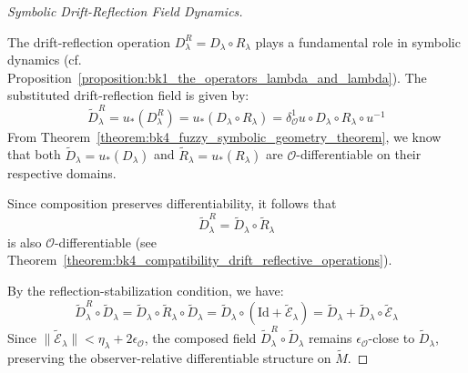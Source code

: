 \begin{proof}[Symbolic Drift-Reflection Field Dynamics]
\label{proof:bk4_drift_reflection_field}
\leavevmode

The drift-reflection operation \( D_\lambda^R = D_\lambda \circ R_\lambda \) plays a fundamental role in symbolic dynamics (cf. Proposition~\ref{proposition:bk1_the_operators_lambda_and_lambda}). The substituted drift-reflection field is given by:
\[
\tilde{D}_\lambda^R = u_*(D_\lambda^R) = u_*(D_\lambda \circ R_\lambda) = \delta^1_\mathcal{O}u \circ D_\lambda \circ R_\lambda \circ u^{-1}
\]
From Theorem~\ref{theorem:bk4_fuzzy_symbolic_geometry_theorem}, we know that both \( \tilde{D}_\lambda = u_*(D_\lambda) \) and \( \tilde{R}_\lambda = u_*(R_\lambda) \) are $\mathcal{O}$-differentiable on their respective domains.

Since composition preserves differentiability, it follows that
\[
\tilde{D}_\lambda^R = \tilde{D}_\lambda \circ \tilde{R}_\lambda
\]
is also $\mathcal{O}$-differentiable (see Theorem~\ref{theorem:bk4_compatibility_drift_reflective_operations}).

By the reflection-stabilization condition, we have:
\[
\tilde{D}_\lambda^R \circ \tilde{D}_\lambda = \tilde{D}_\lambda \circ \tilde{R}_\lambda \circ \tilde{D}_\lambda = \tilde{D}_\lambda \circ (\text{Id} + \tilde{\mathcal{E}}_\lambda) = \tilde{D}_\lambda + \tilde{D}_\lambda \circ \tilde{\mathcal{E}}_\lambda
\]
Since \( \|\tilde{\mathcal{E}}_\lambda\| < \eta_\lambda + 2\epsilon_\mathcal{O} \), the composed field \( \tilde{D}_\lambda^R \circ \tilde{D}_\lambda \) remains \( \epsilon_\mathcal{O} \)-close to \( \tilde{D}_\lambda \), preserving the observer-relative differentiable structure on \( \tilde{M} \).

\end{proof}

